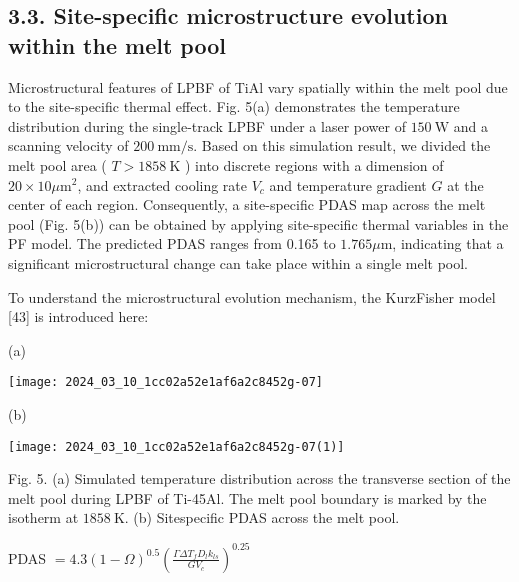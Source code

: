 \documentclass[10pt]{article}
\begin{document}
\subsection*{3.3. Site-specific microstructure evolution within the melt pool}
Microstructural features of LPBF of TiAl vary spatially within the melt pool due to the site-specific thermal effect. Fig. 5(a) demonstrates the temperature distribution during the single-track LPBF under a laser power of $150 \mathrm{~W}$ and a scanning velocity of $200 \mathrm{~mm} / \mathrm{s}$. Based on this simulation result, we divided the melt pool area ( $T>1858 \mathrm{~K}$ ) into discrete regions with a dimension of $20 \times 10 \mu \mathrm{m}^{2}$, and extracted cooling rate $V_{c}$ and temperature gradient $G$ at the center of each region. Consequently, a site-specific PDAS map across the melt pool (Fig. 5(b)) can be obtained by applying site-specific thermal variables in the PF model. The predicted PDAS ranges from 0.165 to $1.765 \mu \mathrm{m}$, indicating that a significant microstructural change can take place within a single melt pool.

To understand the microstructural evolution mechanism, the KurzFisher model [43] is introduced here:

(a)

\begin{center}
\texttt{[image: 2024\_03\_10\_1cc02a52e1af6a2c8452g-07]}
\end{center}

(b)

\begin{center}
\texttt{[image: 2024\_03\_10\_1cc02a52e1af6a2c8452g-07(1)]}
\end{center}

Fig. 5. (a) Simulated temperature distribution across the transverse section of the melt pool during LPBF of Ti-45Al. The melt pool boundary is marked by the isotherm at $1858 \mathrm{~K}$. (b) Sitespecific PDAS across the melt pool.

PDAS $=4.3(1-\Omega)^{0.5}\left(\frac{\Gamma \Delta T_{f} D_{l} k_{l s}}{G V_{c}}\right)^{0.25}$
\end{document}
